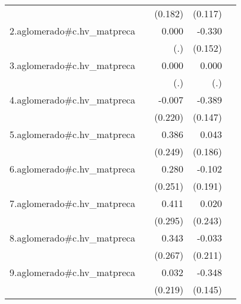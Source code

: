 {\begin{longtable}{l*{4}{D{.}{.}{-1}}}
            &                     &     (0.182)         &     (0.117)         &                     \\
\addlinespace
2.aglomerado#c.hv\_matpreca&                     &       0.000         &      -0.330\sym{*}  &                     \\
            &                     &         (.)         &     (0.152)         &                     \\
\addlinespace
3.aglomerado#c.hv\_matpreca&                     &       0.000         &       0.000         &                     \\
            &                     &         (.)         &         (.)         &                     \\
\addlinespace
4.aglomerado#c.hv\_matpreca&                     &      -0.007         &      -0.389\sym{**} &                     \\
            &                     &     (0.220)         &     (0.147)         &                     \\
\addlinespace
5.aglomerado#c.hv\_matpreca&                     &       0.386         &       0.043         &                     \\
            &                     &     (0.249)         &     (0.186)         &                     \\
\addlinespace
6.aglomerado#c.hv\_matpreca&                     &       0.280         &      -0.102         &                     \\
            &                     &     (0.251)         &     (0.191)         &                     \\
\addlinespace
7.aglomerado#c.hv\_matpreca&                     &       0.411         &       0.020         &                     \\
            &                     &     (0.295)         &     (0.243)         &                     \\
\addlinespace
8.aglomerado#c.hv\_matpreca&                     &       0.343         &      -0.033         &                     \\
            &                     &     (0.267)         &     (0.211)         &                     \\
\addlinespace
9.aglomerado#c.hv\_matpreca&                     &       0.032         &      -0.348\sym{*}  &                     \\
            &                     &     (0.219)         &     (0.145)         &                     \\

\end{longtable}}

